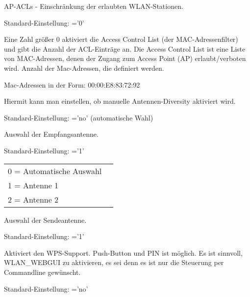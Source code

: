 \begin{description}

        AP-ACLs - Einschränkung der erlaubten WLAN-Stationen.

        Standard-Einstellung: ='0'

        Eine Zahl größer 0 aktiviert die Access Control List (der MAC-Adressenfilter) und gibt die Anzahl der ACL-Einträge an.
        Die Access Control List ist eine Liste von MAC-Adressen,
        denen der Zugang zum Access Point (AP) erlaubt/verboten wird.
        Anzahl der Mac-Adressen, die definiert werden.



        Mac-Adressen in der Form: 00:00:E8:83:72:92


        Hiermit kann man einstellen, ob manuelle Antennen-Diversity aktiviert wird.

        Standard-Einstellung: ='no' (automatische Wahl)


        Auswahl der Empfangsantenne.

        Standard-Einstellung: ='1'

        \begin{tabular}[h]{ll}
        0 = Automatische Auswahl\\
        1 = Antenne 1\\
        2 = Antenne 2\\
        \end{tabular}


        Auswahl der Sendeantenne.

        Standard-Einstellung: ='1'


        Aktiviert den WPS-Support. Push-Button und PIN ist möglich.
        Es ist sinnvoll, WLAN\_WEBGUI zu aktivieren, es sei denn es ist nur
        die Steuerung per Commandline gewünscht.

        Standard-Einstellung: ='no'


\end{description}
